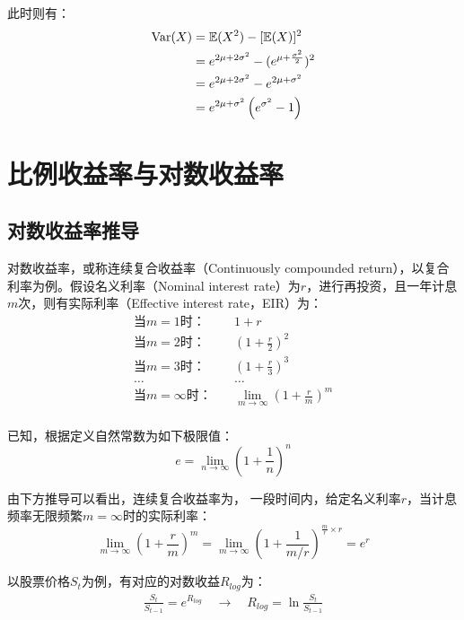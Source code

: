 \documentclass[11pt]{article}
\begin{document}
此时则有：
\begin{align*}
    \operatorname{Var}(X) &= \mathbb{E}(X^2) - [\mathbb{E}(X)]^2  \\
    &= e^{2\mu+2\sigma^2} - (e^{\mu+\frac{\sigma^2}{2}})^2 \\
    &= e^{2\mu+2\sigma^2} - e^{2\mu+\sigma^2} \\
    &= e^{2\mu+\sigma^2}\left(e^{\sigma^2} - 1\right)\\
\end{align*}

\section{比例收益率与对数收益率}

\subsection{对数收益率推导}

对数收益率，或称连续复合收益率（Continuously compounded return），以复合利率为例。假设名义利率（Nominal interest rate）为$r$，进行再投资，且一年计息$m$次，则有实际利率（Effective interest rate，EIR）为：
\begin{equation*}
    \begin{aligned}
        \text{当$m=1$时：} &\quad 1+r \\
        \text{当$m=2$时：} &\quad (1+\frac{r}{2})^2 \\
        \text{当$m=3$时：} &\quad (1+\frac{r}{3})^3 \\
        \dots &\quad \dots \\
        \text{当$m=\infty$时：} &\quad \lim_{m \rightarrow \infty} (1+\frac{r}{m})^m \\
    \end{aligned}
\end{equation*}

已知，根据定义自然常数为如下极限值：
\begin{equation*}
    e = \lim_{n \rightarrow \infty} \left(1+ \frac{1}{n}\right)^n
\end{equation*}

由下方推导可以看出，连续复合收益率为，
一段时间内，给定名义利率$r$，当计息频率无限频繁$m=\infty$时的实际利率：
\begin{equation*}
    \lim_{m \rightarrow \infty} (1+\frac{r}{m})^m = 
    \lim_{m \rightarrow \infty} (1+\frac{1}{m/r})^{\frac{m}{r} \times r} = e^r
\end{equation*}

以股票价格$S_t$为例，有对应的对数收益$R_{log}$为：
\begin{eqnarray}
    \frac{S_t}{S_{t-1}} = e^{R_{log}} \quad\rightarrow\quad R_{log} = \ln \frac{S_t}{S_{t-1}}
\end{eqnarray}
\end{document}
